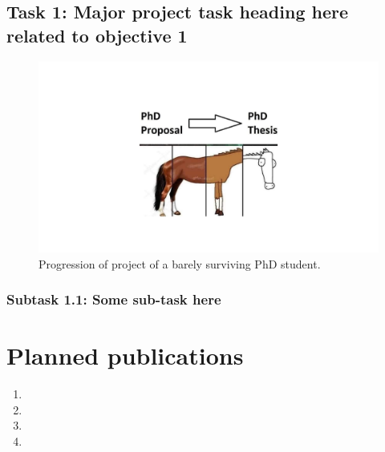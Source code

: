 \documentclass[12pt]{article}
\numberwithin{equation}{section}
\begin{document}
\subsection{Task 1: Major project task heading here related to objective 1}

\blindtext

\begin{figure}[ht]
\begin{center}
    \includegraphics[width=12.5cm, trim={9cm 3cm 9cm 4cm},clip,page=1] {proposal_figures.pdf}
    \caption{Progression of project of a barely surviving PhD student.}
    \label{fig:proposal-plan}
\end{center}
\end{figure}



\subsubsection*{Subtask 1.1: Some sub-task here}
\blindtext






\section{Planned publications}

\begin{enumerate} [leftmargin=0.75cm,itemsep=0pt]
    \item %
    \item %
    \item %
    \item %
\end{enumerate}
\end{document}
